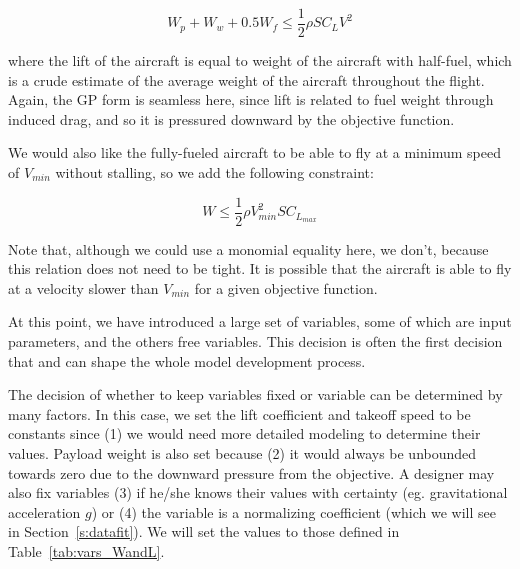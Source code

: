 \begin{equation}
    W_p + W_w + 0.5 W_f \leq \frac{1}{2} \rho S C_L V^2
\end{equation}

where the lift of the aircraft is equal to weight of the aircraft with half-fuel, 
which is a crude estimate of the average weight of the aircraft throughout the flight.
Again, the \gls{GP} form is seamless here, since lift is related to fuel weight through
induced drag, and so it is pressured downward by the objective function.

We would also like the fully-fueled aircraft to be able to fly at a minimum speed 
of $V_{min}$ without stalling, so we add the following constraint:

\begin{equation}
    W \leq \frac{1}{2} \rho V_{min}^2 S C_{L_{max}}
\end{equation}

Note that, although we could use a monomial equality here, we don't, because this
relation does not need to be tight. It is possible that the aircraft is able to
fly at a velocity slower than $V_{min}$ for a given objective function.

At this point, we have introduced a large set of variables, some of which are input
parameters, and the others free variables. This decision is often the first decision
that and can shape the whole model development process.

The decision of whether to keep variables fixed or variable can be determined by many
factors. In this case, we set the lift coefficient and takeoff speed to be constants since
(1) we would need
more detailed modeling to determine their values. Payload weight is also set
because (2) it would always be unbounded towards zero due to the downward pressure from
the objective. A designer may also fix variables (3) if he/she knows their values with
certainty (eg. gravitational acceleration $g$) or (4) the variable is a normalizing
coefficient (which we will see in Section~\ref{s:datafit}). We will set the values
to those defined in Table~\ref{tab:vars_WandL}.

